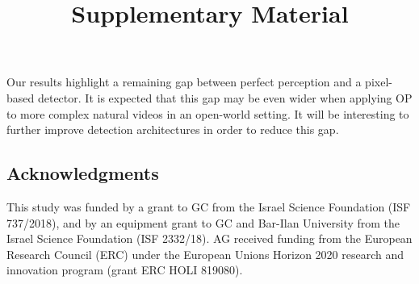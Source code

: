 \documentclass[]{llncs}
\begin{document}
Our results highlight a remaining gap between perfect perception and a pixel-based detector. It is expected that this gap may be even wider when applying OP to more complex natural videos in an open-world setting. It will be interesting to further improve detection architectures in order to reduce this gap. 

\subsection*{Acknowledgments} This study was funded by a grant to GC from the Israel Science Foundation (ISF 737/2018), and by an equipment grant to GC and Bar-Ilan University from the Israel Science Foundation (ISF 2332/18). AG received funding from the European Research Council (ERC) under the European Unions Horizon 2020 research and innovation program (grant ERC HOLI 819080).



\clearpage



\let\cleardoublepage\clearpage



















\renewcommand\thefigure{S\arabic{figure}}    
\renewcommand\thetable{S\arabic{table}}  
\renewcommand\thesection{\Alph{section}}  
\renewcommand{\theequation}{S\arabic{equation}}





\pagestyle{headings}
\mainmatter






\begin{comment}
\titlerunning{Learning Object permanence}
\author{First Author\inst{1}\orcidID{0000-1111-2222-3333} \and
Second Author\inst{2,3}\orcidID{1111-2222-3333-4444} \and
Amir Globerson\inst{2,3}\orcidID{1111-2222-3333-4444} \and
Gal Chechik\inst{3}\orcidID{2222--3333-4444-5555}}
\authorrunning{F. Author et al.}
\institute{Bar-Ilan University, Ramat-Gan, Israel \and
nvidia research, Israel
\email{Gal.Chechik@biu.ac.il}\\
\url{http://chechiklab.biu.ac.il} \and
ABC Institute, Rupert-Karls-University Heidelberg, Heidelberg, Germany\\
\email{\{abc,lncs\}@uni-heidelberg.de}}
\end{comment}
\author{}
\institute{}
\title{Supplementary Material} 
\maketitle
\end{document}
